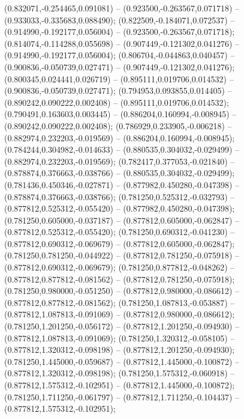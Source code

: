  (0.832071,-0.254465,0.091081) -- (0.923500,-0.263567,0.071718) -- (0.933033,-0.335683,0.088490);
 (0.822509,-0.184071,0.072537) -- (0.914990,-0.192177,0.056004) -- (0.923500,-0.263567,0.071718);
 (0.814074,-0.114288,0.055698) -- (0.907449,-0.121302,0.041276) -- (0.914990,-0.192177,0.056004);
 (0.806704,-0.044863,0.040457) -- (0.900836,-0.050739,0.027471) -- (0.907449,-0.121302,0.041276);
 (0.800345,0.024441,0.026719) -- (0.895111,0.019706,0.014532) -- (0.900836,-0.050739,0.027471);
 (0.794953,0.093855,0.014405) -- (0.890242,0.090222,0.002408) -- (0.895111,0.019706,0.014532);
 (0.790491,0.163603,0.003445) -- (0.886204,0.160994,-0.008945) -- (0.890242,0.090222,0.002408);
 (0.786929,0.233905,-0.006218) -- (0.882974,0.232203,-0.019569) -- (0.886204,0.160994,-0.008945);
 (0.784244,0.304982,-0.014633) -- (0.880535,0.304032,-0.029499) -- (0.882974,0.232203,-0.019569);
 (0.782417,0.377053,-0.021840) -- (0.878874,0.376663,-0.038766) -- (0.880535,0.304032,-0.029499);
 (0.781436,0.450346,-0.027871) -- (0.877982,0.450280,-0.047398) -- (0.878874,0.376663,-0.038766);
 (0.781250,0.525312,-0.032793) -- (0.877812,0.525312,-0.055420) -- (0.877982,0.450280,-0.047398);
 (0.781250,0.605000,-0.037187) -- (0.877812,0.605000,-0.062847) -- (0.877812,0.525312,-0.055420);
 (0.781250,0.690312,-0.041230) -- (0.877812,0.690312,-0.069679) -- (0.877812,0.605000,-0.062847);
 (0.781250,0.781250,-0.044922) -- (0.877812,0.781250,-0.075918) -- (0.877812,0.690312,-0.069679);
 (0.781250,0.877812,-0.048262) -- (0.877812,0.877812,-0.081562) -- (0.877812,0.781250,-0.075918);
 (0.781250,0.980000,-0.051250) -- (0.877812,0.980000,-0.086612) -- (0.877812,0.877812,-0.081562);
 (0.781250,1.087813,-0.053887) -- (0.877812,1.087813,-0.091069) -- (0.877812,0.980000,-0.086612);
 (0.781250,1.201250,-0.056172) -- (0.877812,1.201250,-0.094930) -- (0.877812,1.087813,-0.091069);
 (0.781250,1.320312,-0.058105) -- (0.877812,1.320312,-0.098198) -- (0.877812,1.201250,-0.094930);
 (0.781250,1.445000,-0.059687) -- (0.877812,1.445000,-0.100872) -- (0.877812,1.320312,-0.098198);
 (0.781250,1.575312,-0.060918) -- (0.877812,1.575312,-0.102951) -- (0.877812,1.445000,-0.100872);
 (0.781250,1.711250,-0.061797) -- (0.877812,1.711250,-0.104437) -- (0.877812,1.575312,-0.102951);
